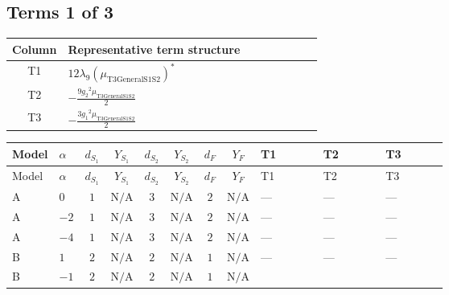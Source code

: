 \documentclass[8pt]{article}
\begin{document}
\begin{landscape}
\subsection*{Terms 1 of 3}
\begin{center}
\begin{tabular}{@{}c >{\raggedright\arraybackslash}p{0.82\linewidth}@{}}
\toprule
Column & Representative term structure \\
\midrule
T1 & \(\displaystyle 12 {\lambda_{9}} \left({\mu_{\mathrm{T3GeneralS1S2}}}\right)^{*}\) \\
\midrule
T2 & \(\displaystyle -\frac{9 {g_2}^2 {\mu_{\mathrm{T3GeneralS1S2}}}}{2}\) \\
\midrule
T3 & \(\displaystyle -\frac{3 {g_1}^2 {\mu_{\mathrm{T3GeneralS1S2}}}}{2}\) \\
\midrule
\bottomrule
\end{tabular}
\end{center}
\smallskip
\tiny
\begin{longtable}{@{}llcccccc >{\raggedright\arraybackslash}p{0.21\linewidth} >{\raggedright\arraybackslash}p{0.21\linewidth} >{\raggedright\arraybackslash}p{0.21\linewidth}@{}}
\toprule
Model & $\alpha$ & $d_{S_1}$ & $Y_{S_1}$ & $d_{S_2}$ & $Y_{S_2}$ & $d_F$ & $Y_F$ & T1 & T2 & T3 \\
\midrule
\endfirsthead
\toprule
Model & $\alpha$ & $d_{S_1}$ & $Y_{S_1}$ & $d_{S_2}$ & $Y_{S_2}$ & $d_F$ & $Y_F$ & T1 & T2 & T3 \\
\midrule
\endhead
A & $0$ & $1$ & $\text{N/A}$ & $3$ & $\text{N/A}$ & $2$ & $\text{N/A}$ & --- & --- & --- \\
\midrule
A & $-2$ & $1$ & $\text{N/A}$ & $3$ & $\text{N/A}$ & $2$ & $\text{N/A}$ & --- & --- & --- \\
\midrule
A & $-4$ & $1$ & $\text{N/A}$ & $3$ & $\text{N/A}$ & $2$ & $\text{N/A}$ & --- & --- & --- \\
\midrule
B & $1$ & $2$ & $\text{N/A}$ & $2$ & $\text{N/A}$ & $1$ & $\text{N/A}$ & --- & --- & --- \\
\midrule
B & $-1$ & $2$ & $\text{N/A}$ & $2$ & $\text{N/A}$ & $1$ & $\text{N/A}$ & \scriptsize\adjustbox{max width=\linewidth}{$\begin{gathered} 12 {\lambda_{9}} \left({\mu_{\mathrm{T3GeneralS1S2}}}\right)^{*}\end{gathered}$} & \scriptsize\adjustbox{max width=\linewidth}{$\begin{gathered} -\frac{9 {g_2}^2 {\mu_{\mathrm{T3GeneralS1S2}}}}{2}\end{gathered}$} & \scriptsize\adjustbox{max width=\linewidth}{$\begin{gathered} -\frac{3 {g_1}^2 {\mu_{\mathrm{T3GeneralS1S2}}}}{2}\end{gathered}$} \\

\end{longtable}
\end{landscape}
\end{document}
